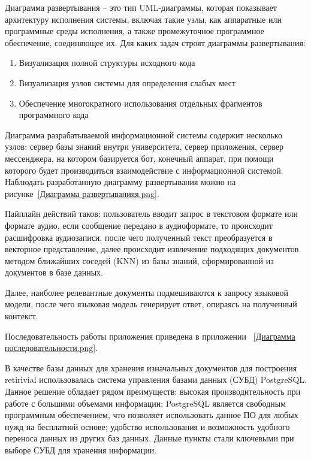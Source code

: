 

Диаграмма развертывания – это тип UML-диаграммы, которая показывает архитектуру
исполнения системы, включая такие узлы, как аппаратные или программные среды
исполнения, а также промежуточное программное обеспечение, соединяющее их. 
Для каких задач строят диаграммы развертывания:

\begin{enumerate}
    \item Визуализация полной структуры исходного кода
    \item Визуализация узлов системы для определения слабых мест
    \item Обеспечение многократного использования отдельных фрагментов
        программного кода
\end{enumerate}

Диаграмма разрабатываемой информационной системы содержит несколько узлов: 
сервер базы знаний внутри университета, сервер приложения, сервер мессенджера,
на котором базируется бот, конечный аппарат, при помощи которого будет 
производиться взаимодействие с информационной системой. Наблюдать разработанную
диаграмму развертывания можно на рисунке~\ref{Диаграмма развертыванияя.png}.




Пайплайн действий таков: пользователь вводит запрос в текстовом формате или 
формате аудио, если сообщение передано в аудиоформате, то происходит 
расшифровка аудиозаписи, после чего полученный текст преобразуется в векторное
представление, далее происходит извлечение подходящих документов методом
ближайших соседей (KNN) из базы знаний, сформированной из документов в базе 
данных.

Далее, наиболее релевантные документы подмешиваются к запросу языковой модели,
после чего языковая модель генерирует ответ, опираясь на полученный контекст.

Последовательность работы приложения приведена в приложении
~\ref{Диаграмма последовательности.png}.


В качестве базы данных для хранения изначальных документов для построения 
retirivial использовалась система управления базами данных (СУБД) PostgreSQL\@.
Данное решение обладает рядом преимуществ: высокая производительность при 
работе с большими объемами информации; PostgreSQL является свободным 
программным обеспечением, что позволяет использовать данное ПО для любых 
нужд на бесплатной основе; удобство использования и возможность удобного 
переноса данных из других баз данных. Данные пункты стали ключевыми при выборе 
СУБД для хранения информации. 

